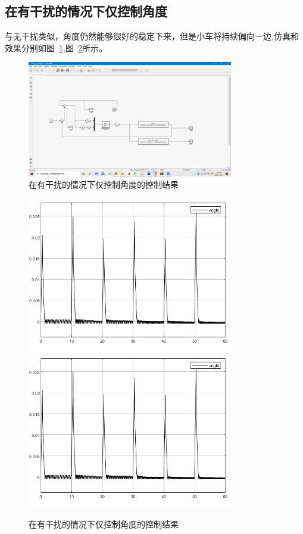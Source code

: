 \subsection{在有干扰的情况下仅控制角度}
与无干扰类似，角度仍然能够很好的稳定下来，但是小车将持续偏向一边,仿真和效果分别如图~\ref{fig:disturbsim},图~\ref{fig:disturb}所示。

\begin{figure}[hbpt]
\centering
\includegraphics[width=9cm]{dis1.png}

\caption{在有干扰的情况下仅控制角度的控制结果}\label{fig:disturbsim}
\end{figure}


\begin{figure}[hbpt]
\centering

\includegraphics[width=9cm]{dis2.png}
\includegraphics[width=9cm]{dis2.png}
\caption{在有干扰的情况下仅控制角度的控制结果}\label{fig:disturb}
\end{figure}

